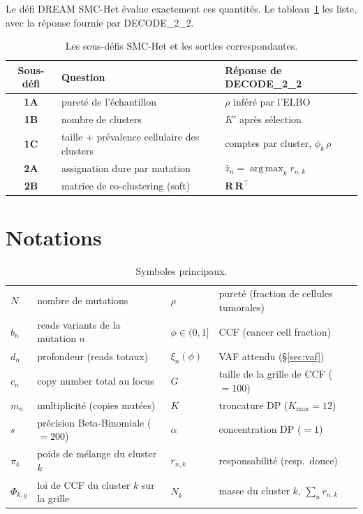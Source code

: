 \documentclass[11pt,a4paper]{article}
\DeclareMathOperator*{\argmax}{arg\,max}
\newcommand{\Rmat}{\mathbf{R}}
\theoremstyle{remark}
\begin{document}
Le défi DREAM SMC-Het évalue exactement ces quantités. Le
tableau~\ref{tab:challenges} les liste, avec la réponse fournie par DECODE\_2\_2.

\begin{table}[h]
\centering
\begin{tabular}{@{}cll@{}}
\toprule
Sous-défi & Question & Réponse de DECODE\_2\_2 \\
\midrule
\textbf{1A} & pureté de l'échantillon            & $\rho$ inféré par l'ELBO \\
\textbf{1B} & nombre de clusters                  & $K'$ après sélection \\
\textbf{1C} & taille + prévalence cellulaire des clusters & comptes par cluster, $\phi_k\,\rho$ \\
\textbf{2A} & assignation dure par mutation       & $\hat z_n=\argmax_k r_{n,k}$ \\
\textbf{2B} & matrice de co-clustering (soft)     & $\Rmat\,\Rmat^{\!\top}$ \\
\bottomrule
\end{tabular}
\caption{Les sous-défis SMC-Het et les sorties correspondantes.}
\label{tab:challenges}
\end{table}

\section{Notations}

\begin{table}[h]
\centering
\small
\begin{tabular}{@{}ll@{\hspace{2.2em}}ll@{}}
\toprule
$N$ & nombre de mutations & $\rho$ & pureté (fraction de cellules tumorales) \\
$b_n$ & reads variants de la mutation $n$ & $\phi\in(0,1]$ & CCF (cancer cell fraction) \\
$d_n$ & profondeur (reads totaux) & $\xi_n(\phi)$ & VAF attendu (\S\ref{sec:vaf}) \\
$c_n$ & copy number total au locus & $G$ & taille de la grille de CCF ($=100$) \\
$m_n$ & multiplicité (copies mutées) & $K$ & troncature DP ($K_{\max}=12$) \\
$s$ & précision Beta-Binomiale ($=200$) & $\alpha$ & concentration DP ($=1$) \\
$\pi_k$ & poids de mélange du cluster $k$ & $r_{n,k}$ & responsabilité (resp.\ douce) \\
$\Phi_{k,g}$ & loi de CCF du cluster $k$ sur la grille & $N_k$ & masse du cluster $k$, $\sum_n r_{n,k}$ \\
\bottomrule
\end{tabular}
\caption{Symboles principaux.}
\label{tab:notation}
\end{table}
\end{document}
